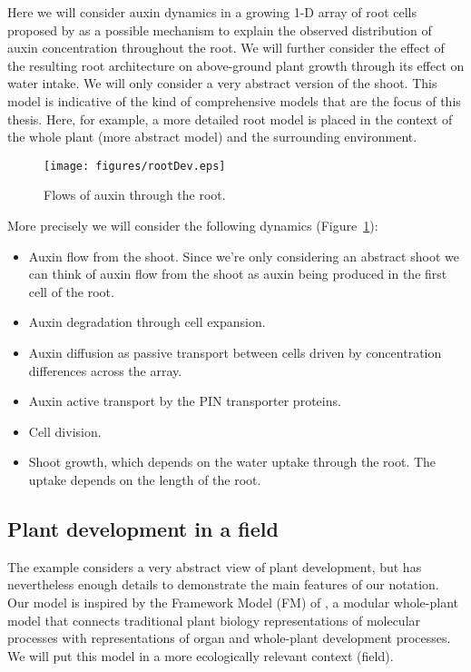 Here we will consider auxin dynamics in a growing 1-D array of root cells
proposed by \citet{mironova_plausible_2010} as a possible mechanism to explain
the observed distribution of auxin concentration throughout the root. We will
further consider the effect of the resulting root architecture on above-ground
plant growth through its effect on water intake. We will only consider a very
abstract version of the shoot. This model is indicative of the kind of
comprehensive models that are the focus of this thesis. Here, for example, a
more detailed root model is placed in the context of the whole plant (more
abstract model) and the surrounding environment.

\begin{figure}
\centering
\texttt{[image: figures/rootDev.eps]}
\caption{Flows of auxin through the root.}
\label{fig:rootDev}
\end{figure}

More precisely we will consider the following dynamics
(Figure~\ref{fig:rootDev}):
\begin{itemize}
\item Auxin flow from the shoot. Since we're only considering an abstract shoot
  we can think of auxin flow from the shoot as auxin being produced in the first
  cell of the root.
\item Auxin degradation through cell expansion.
\item Auxin diffusion as passive transport between cells driven by concentration
  differences across the array.
\item Auxin active transport by the PIN transporter proteins.
\item Cell division.
\item Shoot growth, which depends on the water uptake through the root. The
  uptake depends on the length of the root.
\end{itemize}


\subsection{Plant development in a field}
\label{subsec:plantDev}
The example considers a very abstract view of plant development, but has
nevertheless enough details to demonstrate the main features of our
notation. Our model is inspired by the Framework Model (FM) of
\citet{chew_multiscale_2014}, a modular whole-plant model that connects
traditional plant biology representations of molecular processes with
representations of organ and whole-plant development processes. We will put this
model in a more ecologically relevant context (field).

